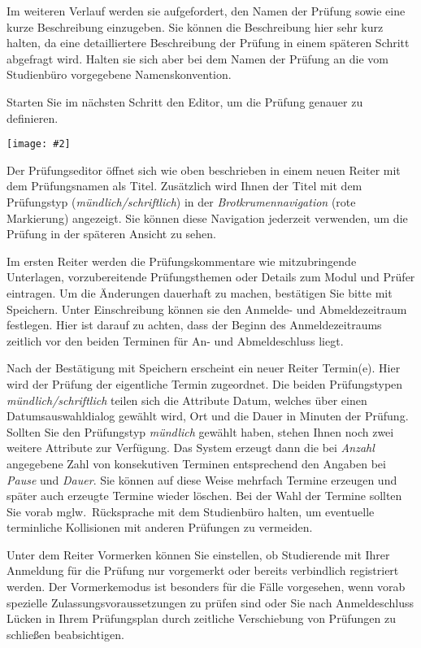 \documentclass[a4paper,11pt]{article}
\newcommand{\bild}[2]{
    \begin{center}\texttt{[image: \#2]}\end{center}
}
\newcommand{\knopf}[1]{{\sc #1}}
\begin{document}
Im weiteren Verlauf werden sie aufgefordert, den Namen der Prüfung sowie eine kurze
Beschreibung einzugeben. Sie können die Beschreibung hier sehr kurz halten, da
eine detailliertere Beschreibung der Prüfung in einem späteren Schritt
abgefragt wird. Halten sie sich aber bei dem Namen der Prüfung an die vom
Studienbüro vorgegebene Namenskonvention. 

Starten Sie im nächsten Schritt den Editor, um die Prüfung genauer zu
definieren.

\bild{1}{Pruefung-Erzeugen-Editor}

Der Prüfungseditor öffnet sich wie oben beschrieben in einem neuen Reiter mit
dem Prüfungsnamen als Titel. Zusätzlich wird Ihnen der Titel mit dem Prüfungstyp
({\em mündlich/schriftlich}) in der {\em Brotkrumennavigation} (rote Markierung)
angezeigt. Sie können diese Navigation jederzeit verwenden, um die Prüfung
in der späteren Ansicht zu sehen. 

Im ersten Reiter werden die Prüfungskommentare wie mitzubringende
Unterlagen, vorzubereitende Prüfungsthemen oder Details zum Modul und Prüfer eintragen.
Um die Änderungen
dauerhaft zu machen, bestätigen Sie bitte mit \knopf{Speichern}. Unter
\knopf{Einschreibung} können sie den Anmelde- und Abmeldezeitraum
festlegen. Hier ist darauf zu achten, dass der Beginn des Anmeldezeitraums
zeitlich vor den beiden Terminen für An- und Abmeldeschluss liegt.

Nach der Bestätigung mit \knopf{Speichern} erscheint ein neuer Reiter
\knopf{Termin(e)}. Hier wird der Prüfung der eigentliche Termin zugeordnet.
Die beiden Prüfungstypen {\em mündlich/schriftlich} teilen sich die Attribute
Datum, welches über einen Datumsauswahldialog gewählt wird, Ort und die Dauer
in Minuten der Prüfung. Sollten Sie den Prüfungstyp {\em mündlich} gewählt
haben, stehen Ihnen noch zwei weitere Attribute zur Verfügung. Das System
erzeugt dann die bei {\em Anzahl} angegebene Zahl von konsekutiven Terminen
entsprechend den Angaben bei {\em Pause} und {\em Dauer}.  Sie können auf
diese Weise mehrfach Termine erzeugen und später auch erzeugte Termine wieder
löschen.  Bei der Wahl der Termine sollten Sie vorab mglw.\ Rücksprache mit
dem Studienbüro halten, um eventuelle terminliche Kollisionen mit anderen
Prüfungen zu vermeiden.

Unter dem Reiter \knopf{Vormerken} können Sie einstellen, ob Studierende mit
Ihrer Anmeldung für die Prüfung nur vorgemerkt oder bereits verbindlich
registriert werden.  Der Vormerkemodus ist besonders für die Fälle vorgesehen,
wenn vorab spezielle Zulassungsvoraussetzungen zu prüfen sind oder Sie nach
Anmeldeschluss Lücken in Ihrem Prüfungsplan durch zeitliche Verschiebung von
Prüfungen zu schließen beabsichtigen.  
\end{document}
